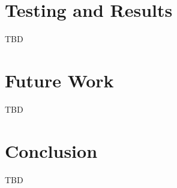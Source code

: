 \documentclass[conference]{IEEEtran}
\begin{document}
\section{Testing and Results}

TBD

\section{Future Work}

TBD

\section{Conclusion}

TBD



\end{document}
